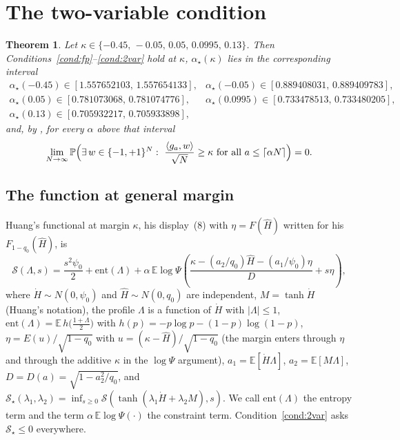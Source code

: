 \documentclass[11pt]{article}
\newtheorem{theorem}{Theorem}
\theoremstyle{remark}
\newcommand{\E}{\mathbb{E}}
\newcommand{\Prob}{\mathbb{P}}
\newcommand{\sS}{\mathcal{S}}
\begin{document}
\section{The two-variable condition}\label{sec:twovarfn}

\begin{theorem}\label{thm:main}
Let $\kappa\in\{-0.45,\,-0.05,\,0.05,\,0.0995,\,0.13\}$.  Then
Conditions~\ref{cond:fp}--\ref{cond:2var} hold at $\kappa$,
$\alpha_\star(\kappa)$ lies in the corresponding interval
\[
\begin{array}{ll}
\alpha_\star(-0.45)\in[1.557652103,\,1.557654133], &
\alpha_\star(-0.05)\in[0.889408031,\,0.889409783],\\
\alpha_\star(0.05)\in[0.781073068,\,0.781074776], &
\alpha_\star(0.0995)\in[0.733478513,\,0.733480205],\\
\alpha_\star(0.13)\in[0.705932217,\,0.705933898], &
\end{array}
\]
and, by \cite[Theorem~3.6]{huang2024capacity}, for every $\alpha$ above that interval
\[
\lim_{N\to\infty}\Prob\Bigl(\exists\,w\in\{-1,+1\}^N:\
\frac{\langle g_a,w\rangle}{\sqrt N}\ge\kappa\ \text{for all }
a\le\lceil\alpha N\rceil\Bigr)=0 .
\]
\end{theorem}

\subsection{The function at general margin}\label{sec:twovar}

Huang's functional at margin $\kappa$, his display~(8)
with $\eta=F(\hat H)$ written for his $F_{1-q_0}(\hat H)$, is
\[
\sS(\Lambda,s)=\frac{s^2\psi_0}{2}+\mathrm{ent}(\Lambda)
+\alpha\,\E\log\Psi\!\left(
\frac{\kappa-(a_2/q_0)\hat H-(a_1/\psi_0)\eta}{D}+s\eta\right),
\]
where $\dot H\sim N(0,\psi_0)$ and $\hat H\sim N(0,q_0)$ are
independent, $M=\tanh\dot H$ (Huang's notation), the profile
$\Lambda$ is a function of $\dot H$ with $|\Lambda|\le1$,
$\mathrm{ent}(\Lambda)=\E\,h\bigl(\tfrac{1+\Lambda}{2}\bigr)$ with
$h(p)=-p\log p-(1-p)\log(1-p)$, $\eta=E(u)/\sqrt{1-q_0}$ with
$u=(\kappa-\hat H)/\sqrt{1-q_0}$ (the margin enters through
$\eta$ and through the additive $\kappa$ in the $\log\Psi$
argument), $a_1=\E[\dot H\Lambda]$, $a_2=\E[M\Lambda]$,
$D=D(a)=\sqrt{1-a_2^2/q_0}$, and
$\sS_\star(\lambda_1,\lambda_2)=\inf_{s\ge0}
\sS(\tanh(\lambda_1\dot H+\lambda_2 M),s)$.
We call $\mathrm{ent}(\Lambda)$ the entropy term and the term
$\alpha\,\E\log\Psi(\cdot)$ the constraint term.
Condition~\ref{cond:2var} asks $\sS_\star\le0$ everywhere.
\end{document}

